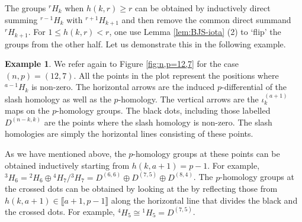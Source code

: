 \documentclass[a4paper]{amsart}
\numberwithin{equation}{subsection}
\theoremstyle{definition}
\newtheorem{example}[theorem]{Example}
\newcommand{\interval}[1]{\llbracket #1 \rrbracket}
\numberwithin{equation}{subsection}
\begin{document}
The groups ${}^rH_k$ when $h(k,r)\geq r$ can be obtained by inductively  direct summing ${}^{r-1}H_k$ with ${}^{r+1}H_{k+1}$ and then remove the common direct summand ${}^{r}H_{k+1}$.  For $1\leq h(k,r)<r$, one use Lemma \ref{lem:BJS-iota} (2) to `flip' the groups from the other half.
Let us demonstrate this in the following example.

\begin{example}
We refer again to Figure \ref{fig:n,p=12,7} for the case $(n,p)=(12,7)$.  All the points in the plot represent the positions where ${}^{a-1}H_k$ is non-zero.  The horizontal arrows are the induced $p$-differential of the slash homology as well as the $p$-homology.  The vertical arrows are the $\iota_k^{(a+1)}$ maps on the $p$-homology groups.  The black dots, including those labelled $D^{(n-k,k)}$ are the points where the slash homology is non-zero.  The slash homologies are simply the horizontal lines consisting of these points.

As we have mentioned above, the $p$-homology groups at these points can be obtained inductively starting from $h(k,a+1)=p-1$.  For example, ${}^3H_6 = {}^2H_6\oplus {}^4H_7/{}^3H_7 = D^{(6,6)}\oplus D^{(7,5)}\oplus D^{(8,4)}$.  The $p$-homology groups at the crossed dots can be obtained by looking at the by reflecting those from $h(k,a+1)\in\interval{a+1,p-1}$ along the horizontal line that divides the black and the crossed dots.  For example, ${}^4H_5 \cong {}^1H_5 = D^{(7,5)}$.
\end{example}
\end{document}

